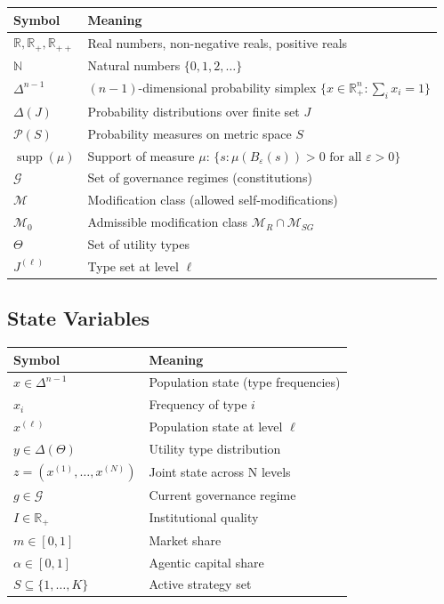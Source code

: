 \documentclass[12pt]{article}
\newcommand{\R}{\mathbb{R}}
\newcommand{\N}{\mathbb{N}}
\DeclareMathOperator{\supp}{supp}
\begin{document}
\begin{tabular}{ll}
\toprule
\textbf{Symbol} & \textbf{Meaning} \\
\midrule
$\R, \R_+, \R_{++}$ & Real numbers, non-negative reals, positive reals \\
$\N$ & Natural numbers $\{0, 1, 2, \ldots\}$ \\
$\Delta^{n-1}$ & $(n-1)$-dimensional probability simplex $\{x \in \R^n_+ : \sum_i x_i = 1\}$ \\
$\Delta(J)$ & Probability distributions over finite set $J$ \\
$\mathcal{P}(S)$ & Probability measures on metric space $S$ \\
$\supp(\mu)$ & Support of measure $\mu$: $\{s : \mu(B_\varepsilon(s)) > 0 \text{ for all } \varepsilon > 0\}$ \\
$\mathcal{G}$ & Set of governance regimes (constitutions) \\
$\mathcal{M}$ & Modification class (allowed self-modifications) \\
$\mathcal{M}_0$ & Admissible modification class $\mathcal{M}_R \cap \mathcal{M}_{SG}$ \\
$\Theta$ & Set of utility types \\
$J^{(\ell)}$ & Type set at level $\ell$ \\
\bottomrule
\end{tabular}

\subsection{State Variables}

\begin{tabular}{ll}
\toprule
\textbf{Symbol} & \textbf{Meaning} \\
\midrule
$x \in \Delta^{n-1}$ & Population state (type frequencies) \\
$x_i$ & Frequency of type $i$ \\
$x^{(\ell)}$ & Population state at level $\ell$ \\
$y \in \Delta(\Theta)$ & Utility type distribution \\
$z = (x^{(1)}, \ldots, x^{(N)})$ & Joint state across N levels \\
$g \in \mathcal{G}$ & Current governance regime \\
$I \in \R_+$ & Institutional quality \\
$m \in [0, 1]$ & Market share \\
$\alpha \in [0, 1]$ & Agentic capital share \\
$S \subseteq \{1, \ldots, K\}$ & Active strategy set \\
\bottomrule
\end{tabular}
\end{document}
